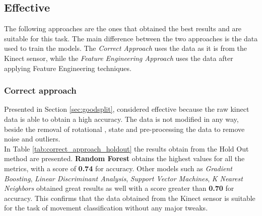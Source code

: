         \subsection{Effective}

                The following approaches are the ones that obtained the best results and are suitable for this task. The main difference between the two approaches is the data used to train the models. The \textit{Correct Approach} uses the data as it is from the Kinect sensor, while the \textit{Feature Engineering Approach} uses the data after applying Feature Engineering techniques.
                
            \subsubsection{Correct approach}

                Presented in Section \ref{sec:goodsplit}, considered effective because the raw kinect data is able to obtain a high accuracy. The data is not modified in any way, beside the removal of rotational , state  and pre-processing the data to remove noise and outliers.\\
                 
                In Table \ref{tab:correct_approach_holdout} the results obtain from the Hold Out method are presented. \textbf{Random Forest} obtains the highest values for all the metrics, with a score of \textbf{0.74} for accuracy. Other models such as \textit{Gradient Boosting}, \textit{Linear Discriminant Analysis}, \textit{Support Vector Machines}, \textit{K Nearest Neighbors} obtained great results as well with a score greater than \textbf{0.70} for accuracy. This confirms that the data obtained from the Kinect sensor is suitable for the task of movement classification without any major tweaks.\\
                
                \newpage

